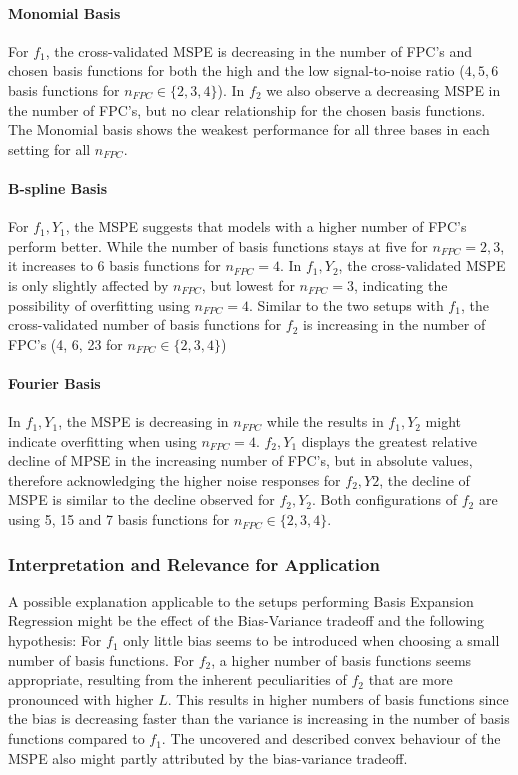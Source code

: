 \documentclass[11pt,twoside,a4paper]{article}
\begin{document}
	\paragraph{Monomial Basis}
	For $f_1$, the cross-validated MSPE is decreasing in the number of FPC's and chosen basis functions for both the high and the low signal-to-noise ratio ($4,5,6$ basis functions for $n_{FPC} \in \{2, 3, 4 \}$). In  $f_2$ we also observe a decreasing MSPE in the number of FPC's, but no clear relationship for the chosen basis functions. The Monomial basis shows the weakest performance for all three bases in each setting for all $n_{FPC}$.
	\vspace{-0.2cm}
	
	\paragraph{B-spline Basis}
	For $f_1,Y_1$, the MSPE suggests that models with a higher number of FPC's perform better. While the number of basis functions stays at five for $n_{FPC} = 2,3$, it increases to 6 basis functions for $n_{FPC} = 4$. In $f_1,Y_2$, the cross-validated MSPE is only slightly affected by $n_{FPC}$, but lowest for $n_{FPC} = 3$, indicating the possibility of overfitting using $n_{FPC} = 4$. Similar to the two setups with $f_1$, the cross-validated number of basis functions for $f_2$ is increasing in the number of FPC's (4, 6, 23 for $n_{FPC} \in \{2, 3, 4 \}$)
	\vspace{-0.2cm}
	
	\paragraph{Fourier Basis}
	In $f_1,Y_1$, the MSPE is decreasing in $n_{FPC}$ while the results in $f_1,Y_2$ might indicate overfitting when using $n_{FPC} = 4$. $f_2,Y_1$ displays the greatest relative decline of MPSE in the increasing number of FPC's, but in absolute values, therefore acknowledging the higher noise responses for $f_2,Y2$, the decline of MSPE is similar to the decline observed for $f_2,Y_2$. Both configurations of $f_2$ are using 5, 15 and 7 basis functions for $n_{FPC} \in \{2, 3, 4 \}$.
	\vspace{-0.2cm}	
	
	\subsubsection{Interpretation and Relevance for Application}
	A possible explanation applicable to the setups performing Basis Expansion Regression might be the effect of the Bias-Variance tradeoff and the following hypothesis: For $f_1$ only little bias seems to be introduced when choosing a small number of basis functions. For $f_2$, a higher number of basis functions seems appropriate, resulting from the inherent peculiarities of $f_2$ that are more pronounced with higher $L$. This results in higher numbers of basis functions since the bias is decreasing faster than the variance is increasing in the number of basis functions compared to $f_1$. The uncovered and described convex behaviour of the MSPE also might partly attributed by the bias-variance tradeoff. 
	
\end{document}
